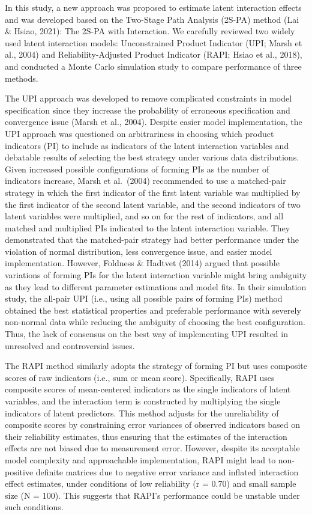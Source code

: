 \documentclass[
  man]{apa7}
\begin{document}
In this study, a new approach was proposed to estimate latent interaction effects and was developed based on the Two-Stage Path Analysis (2S-PA) method (Lai \& Hsiao, 2021): The 2S-PA with Interaction. We carefully reviewed two widely used latent interaction models: Unconstrained Product Indicator (UPI; Marsh et al., 2004) and Reliability-Adjusted Product Indicator (RAPI; Hsiao et al., 2018), and conducted a Monte Carlo simulation study to compare performance of three methods.

The UPI approach was developed to remove complicated constraints in model specification since they increase the probability of erroneous specification and convergence issue (Marsh et al., 2004). Despite easier model implementation, the UPI approach was questioned on arbitrariness in choosing which product indicators (PI) to include as indicators of the latent interaction variables and debatable results of selecting the best strategy under various data distributions. Given increased possible configurations of forming PIs as the number of indicators increase, Marsh et al.~(2004) recommended to use a matched-pair strategy in which the first indicator of the first latent variable was multiplied by the first indicator of the second latent variable, and the second indicators of two latent variables were multiplied, and so on for the rest of indicators, and all matched and multiplied PIs indicated to the latent interaction variable. They demonstrated that the matched-pair strategy had better performance under the violation of normal distribution, less convergence issue, and easier model implementation. However, Foldness \& Hadtvet (2014) argued that possible variations of forming PIs for the latent interaction variable might bring ambiguity as they lead to different parameter estimations and model fits. In their simulation study, the all-pair UPI (i.e., using all possible pairs of forming PIs) method obtained the best statistical properties and preferable performance with severely non-normal data while reducing the ambiguity of choosing the best configuration. Thus, the lack of consensus on the best way of implementing UPI resulted in unresolved and controversial issues.

The RAPI method similarly adopts the strategy of forming PI but uses composite scores of raw indicators (i.e., sum or mean score). Specifically, RAPI uses composite scores of mean-centered indicators as the single indicators of latent variables, and the interaction term is constructed by multiplying the single indicators of latent predictors. This method adjusts for the unreliability of composite scores by constraining error variances of observed indicators based on their reliability estimates, thus ensuring that the estimates of the interaction effects are not biased due to measurement error. However, despite its acceptable model complexity and approachable implementation, RAPI might lead to non-positive definite matrices due to negative error variance and inflated interaction effect estimates, under conditions of low reliability (r = 0.70) and small sample size (N = 100). This suggests that RAPI's performance could be unstable under such conditions.
\end{document}
